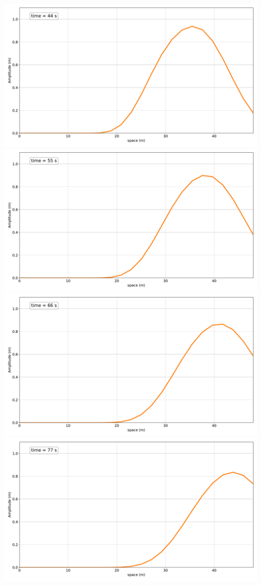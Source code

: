   \includegraphics[width=\linewidth]{../BurgersEquation/images/Linear_Convection4.pdf}
  \includegraphics[width=\linewidth]{../BurgersEquation/images/Linear_Convection5.pdf}
  \includegraphics[width=\linewidth]{../BurgersEquation/images/Linear_Convection6.pdf}
  \includegraphics[width=\linewidth]{../BurgersEquation/images/Linear_Convection7.pdf}
